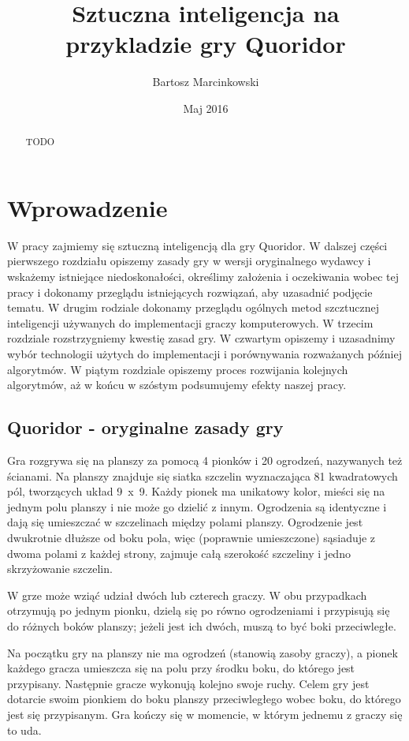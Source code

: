 \documentclass{pracamgr}
\author{Bartosz Marcinkowski}
\title{Sztuczna inteligencja na przykladzie gry Quoridor}
\date{Maj 2016}
\begin{document}
\maketitle

\begin{abstract}
TODO
\end{abstract}

\tableofcontents


\chapter{Wprowadzenie}

W pracy zajmiemy się sztuczną inteligencją dla gry Quoridor. W dalszej części pierwszego rozdziału opiszemy zasady gry w wersji oryginalnego wydawcy i wskażemy istniejące niedoskonałości, określimy założenia i oczekiwania wobec tej pracy i dokonamy przeglądu istniejących rozwiązań, aby uzasadnić podjęcie tematu. W drugim rodziale dokonamy przeglądu ogólnych metod szcztucznej inteligencji używanych do implementacji graczy komputerowych. W trzecim rozdziale rozstrzygniemy kwestię zasad gry. W czwartym opiszemy i uzasadnimy wybór technologii użytych do implementacji i porównywania rozważanych później algorytmów. W piątym rozdziale opiszemy proces rozwijania kolejnych algorytmów, aż w końcu w szóstym podsumujemy efekty naszej pracy.

\section{Quoridor - oryginalne zasady gry}

Gra rozgrywa się na planszy za pomocą 4 pionków i 20 ogrodzeń, nazywanych też ścianami. Na planszy znajduje się siatka szczelin wyznaczająca 81 kwadratowych pól, tworzących układ 9~x~9. Każdy pionek ma unikatowy kolor, mieści się na jednym polu planszy i nie może go dzielić z innym. Ogrodzenia są identyczne i dają się umieszczać w szczelinach między polami planszy. Ogrodzenie jest dwukrotnie dłuższe od boku pola, więc (poprawnie umieszczone) sąsiaduje z dwoma polami z każdej strony, zajmuje całą szerokość szczeliny i jedno skrzyżowanie szczelin.

W grze może wziąć udział dwóch lub czterech graczy. W obu przypadkach otrzymują po jednym pionku, dzielą się po równo ogrodzeniami i przypisują się do różnych boków planszy; jeżeli jest ich dwóch, muszą to być boki przeciwległe.

Na początku gry na planszy nie ma ogrodzeń (stanowią zasoby graczy), a pionek każdego gracza umieszcza się na polu przy środku boku, do którego jest przypisany.
Następnie gracze wykonują kolejno swoje ruchy. Celem gry jest dotarcie swoim pionkiem do boku planszy przeciwległego wobec boku, do którego jest się przypisanym. Gra kończy się w momencie, w którym jednemu z graczy się to uda.
\end{document}

